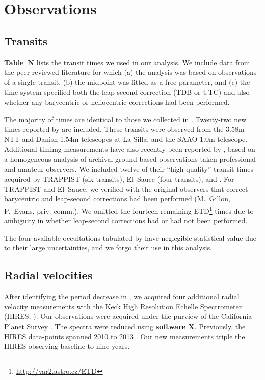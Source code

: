 \documentclass[12pt,twocolumn,tighten]{aastex62}
\begin{document}
\section{Observations}
\label{sec:observations}

\subsection{Transits}

{\bf Table~N} lists the transit times we used in our analysis.  We
include data from the peer-reviewed literature for which (a) the
analysis was based on observations of a single transit, (b) the
midpoint was fitted as a free parameter, and (c) the time system
specified both the leap second correction (TDB or UTC) and also
whether any barycentric or heliocentric corrections had been
performed.

The majority of times are identical to those we collected in
.  Twenty-two new times reported by
\citet{southworth_transit_2019} are included.  These transits were
observed from the 3.58m NTT and Danish 1.54m telescopes at La Silla,
and the SAAO 1.0m telescope.  Additional timimg
measurements have also recently been reported by \citet{baluev_2019},
based on a homogeneous analysis of archival ground-based observations
taken professional and amateur observers.  We included
twelve of their ``high quality'' transit times acquired by TRAPPIST
(six transits), El~Sauce (four transits), and
\citet{petrucci_no_2013}.  For TRAPPIST and El~Sauce, we verified with
the original observers that correct barycentric and leap-second
corrections had been performed (M.~Gillon, P.~Evans, priv{.} comm{.}).
We omitted the fourteen remaining \citeauthor{baluev_2019}
ETD\footnote{\url{http://var2.astro.cz/ETD}} times due to ambiguity in
whether leap-second corrections had or had not been performed.

The four available occultations tabulated by
 have neglegible statistical value due
to their large uncertainties, and we forgo their use in this analysis.

\subsection{Radial velocities}

After identifying the period decrease in
, we acquired four additional radial
velocity measurements with the Keck High Resolution Echelle
Spectrometer (HIRES, \citealt{vogt_hires_1994}).  Our observations
were acquired under the purview of the California Planet Survey
\citep{howard_cps_2010}.  The spectra were reduced using {\bf software
X}.  Previously, the HIRES data-points spanned 2010 to 2013
\citep{knutson_friends_2014}.  Our new measurements triple the HIRES
observing baseline to nine years.
\end{document}
